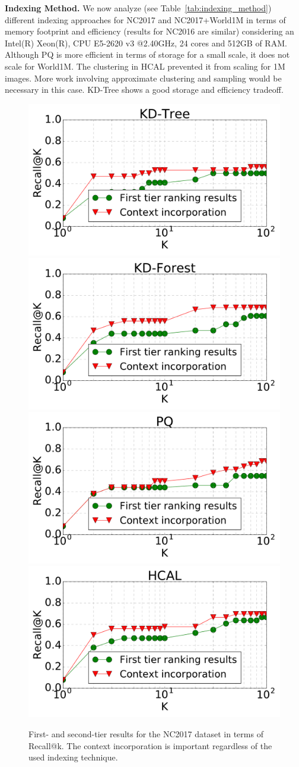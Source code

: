 \vspace*{0.1cm}
\noindent
\textbf{Indexing Method.} We now analyze (see Table~\ref{tab:indexing_method}) different indexing approaches for NC2017 and NC2017+World1M in terms of memory footprint and efficiency (results for NC2016 are similar) considering an Intel(R) Xeon(R), CPU E5-2620 v3 @2.40GHz, 24 cores and 512GB of RAM. Although PQ is more efficient in terms of storage for a small scale, it does not scale for World1M. The clustering in HCAL prevented it from scaling for 1M images. More work involving approximate clustering and sampling would be necessary in this case. KD-Tree shows a good storage and efficiency tradeoff. 
%
\begin{figure}[t]
	\begin{center}
	\includegraphics[width=0.48\linewidth]{nimble2017-alien-kdtree-recall_pr}
	\includegraphics[width=0.48\linewidth]{nimble2017-alien-kdforest-recall_pr}
	\\
	\includegraphics[width=0.48\linewidth]{nimble2017-alien-pq-recall_pr}
	\includegraphics[width=0.48\linewidth]{nimble2017-alien-hcal-recall_pr}
	\caption{First- and second-tier results for the NC2017 dataset in terms of Recall@k. The context incorporation is important regardless of the  used indexing technique.\label{fig:indexing_compararison_2017}}	
	\end{center}	
\end{figure}

